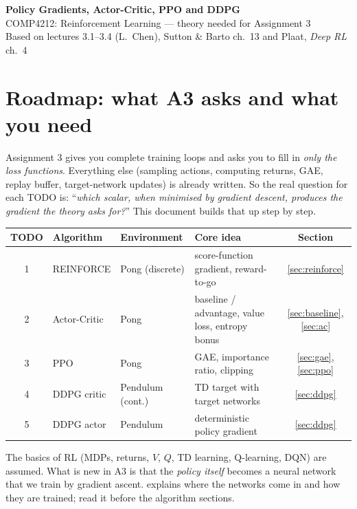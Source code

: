 \documentclass[11pt,a4paper]{article}
\begin{document}
\begin{center}
  {\LARGE\bfseries Policy Gradients, Actor-Critic, PPO and DDPG}\\[0.4em]
  {\large COMP4212: Reinforcement Learning --- theory needed for Assignment 3}\\[0.3em]
  Based on lectures 3.1--3.4 (L.\ Chen), Sutton \& Barto ch.~13 and Plaat, \emph{Deep RL} ch.~4
\end{center}

\bigskip

\section{Roadmap: what A3 asks and what you need}

Assignment 3 gives you complete training loops and asks you to fill in \emph{only the loss functions}.
Everything else (sampling actions, computing returns, GAE, replay buffer, target-network updates) is already written.
So the real question for each TODO is: \enquote{\emph{which scalar, when minimised by gradient descent, produces the gradient the theory asks for?}}
This document builds that up step by step.

\begin{center}
\begingroup
\renewcommand{\arraystretch}{1.2}
\begin{tabularx}{\textwidth}{@{}c l l X c@{}}
\toprule
TODO & Algorithm & Environment & Core idea & Section \\
\midrule
1 & REINFORCE & Pong (discrete) & score-function gradient, reward-to-go & \ref{sec:reinforce} \\
2 & Actor-Critic & Pong & baseline / advantage, value loss, entropy bonus & \ref{sec:baseline}, \ref{sec:ac} \\
3 & PPO & Pong & GAE, importance ratio, clipping & \ref{sec:gae}, \ref{sec:ppo} \\
4 & DDPG critic & Pendulum (cont.) & TD target with target networks & \ref{sec:ddpg} \\
5 & DDPG actor & Pendulum & deterministic policy gradient & \ref{sec:ddpg} \\
\bottomrule
\end{tabularx}
\endgroup
\end{center}

The basics of RL (MDPs, returns, $V$, $Q$, TD learning, Q-learning, DQN) are assumed. What is new in A3 is that the \emph{policy itself} becomes a neural network that we train by gradient ascent.  explains where the networks come in and how they are trained; read it before the algorithm sections.
\end{document}
